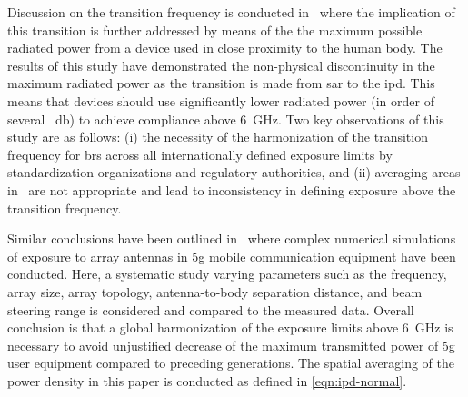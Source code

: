 Discussion on the transition frequency is conducted in~\cite{Colombi2015} where the implication of this transition is further addressed by means of the the maximum possible radiated power from a device used in close proximity to the human body.
The results of this study have demonstrated the non-physical discontinuity in the maximum radiated power as the transition is made from \gls{sar} to the \gls{ipd}.
This means that devices should use significantly lower radiated power (in order of several \SI{}{\decibel}) to achieve compliance above \SI{6}{\GHz}.
Two key observations of this study are as follows: (i) the necessity of the harmonization of the transition frequency for \gls{br}s across all internationally defined exposure limits by standardization organizations and regulatory authorities, and (ii) averaging areas in~\cite{ICNIRP1998Guidlines,IEEE2005Standard} are not appropriate and lead to inconsistency in defining exposure above the transition frequency.

Similar conclusions have been outlined in~\cite{Thors2016Exposure} where complex numerical simulations of exposure to array antennas in \gls{5g} mobile communication equipment have been conducted.
Here, a systematic study varying parameters such as the frequency, array size, array topology, antenna-to-body separation distance, and beam steering range is considered and compared to the measured data.
Overall conclusion is that a global harmonization of the exposure limits above \SI{6}{\GHz} is necessary to avoid unjustified decrease of the maximum transmitted power of \gls{5g} user equipment compared to preceding generations.
The spatial averaging of the power density in this paper is conducted as defined in \cref{eqn:ipd-normal}.

